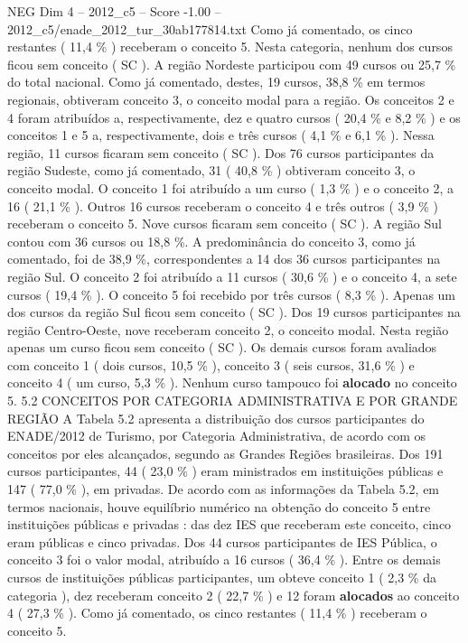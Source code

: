 \begin{textsample}{NEG Dim 4 – 2012\_c5 – Score -1.00 – 2012\_c5/enade\_2012\_tur\_30ab177814.txt}
Como já comentado, os cinco restantes ( 11,4 \% ) receberam o conceito 5.
Nesta categoria, nenhum dos cursos ficou sem conceito ( SC ).
A região Nordeste participou com 49 cursos ou 25,7 \% do total nacional.
Como já comentado, destes, 19 cursos, 38,8 \% em termos regionais, obtiveram conceito 3, o conceito modal para a região.
Os conceitos 2 e 4 foram atribuídos a, respectivamente, dez e quatro cursos ( 20,4 \% e 8,2 \% ) e os conceitos 1 e 5 a, respectivamente, dois e três cursos ( 4,1 \% e 6,1 \% ).
Nessa região, 11 cursos ficaram sem conceito ( SC ).
Dos 76 cursos participantes da região Sudeste, como já comentado, 31 ( 40,8 \% ) obtiveram conceito 3, o conceito modal.
O conceito 1 foi atribuído a um curso ( 1,3 \% ) e o conceito 2, a 16 ( 21,1 \% ).
Outros 16 cursos receberam o conceito 4 e três outros ( 3,9 \% ) receberam o conceito 5.
Nove cursos ficaram sem conceito ( SC ).
A região Sul contou com 36 cursos ou 18,8 \%.
A predominância do conceito 3, como já comentado, foi de 38,9 \%, correspondentes a 14 dos 36 cursos participantes na região Sul.
O conceito 2 foi atribuído a 11 cursos ( 30,6 \% ) e o conceito 4, a sete cursos ( 19,4 \% ).
O conceito 5 foi recebido por três cursos ( 8,3 \% ).
Apenas um dos cursos da região Sul ficou sem conceito ( SC ).
Dos 19 cursos participantes na região Centro-Oeste, nove receberam conceito 2, o conceito modal.
Nesta região apenas um curso ficou sem conceito ( SC ).
Os demais cursos foram avaliados com conceito 1 ( dois cursos, 10,5 \% ), conceito 3 ( seis cursos, 31,6 \% ) e conceito 4 ( um curso, 5,3 \% ).
Nenhum curso tampouco foi \textbf{alocado} no conceito 5. 5.2 CONCEITOS POR CATEGORIA ADMINISTRATIVA E POR GRANDE REGIÃO A Tabela 5.2 apresenta a distribuição dos cursos participantes do ENADE/2012 de Turismo, por Categoria Administrativa, de acordo com os conceitos por eles alcançados, segundo as Grandes Regiões brasileiras.
Dos 191 cursos participantes, 44 ( 23,0 \% ) eram ministrados em instituições públicas e 147 ( 77,0 \% ), em privadas.
De acordo com as informações da Tabela 5.2, em termos nacionais, houve equilíbrio numérico na obtenção do conceito 5 entre instituições públicas e privadas : das dez IES que receberam este conceito, cinco eram públicas e cinco privadas.
Dos 44 cursos participantes de IES Pública, o conceito 3 foi o valor modal, atribuído a 16 cursos ( 36,4 \% ).
Entre os demais cursos de instituições públicas participantes, um obteve conceito 1 ( 2,3 \% da categoria ), dez receberam conceito 2 ( 22,7 \% ) e 12 foram \textbf{alocados} ao conceito 4 ( 27,3 \% ).
Como já comentado, os cinco restantes ( 11,4 \% ) receberam o conceito 5.

\end{textsample}
